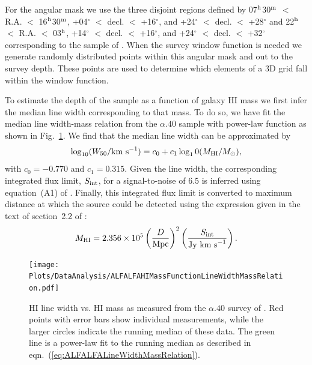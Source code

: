 For the angular mask we use the three disjoint regions defined by 07$^{\rm h}$30$^{\rm m}$ $<$ R.A. $<$ 16$^{\rm h}$30$^{\rm m}$, +04$^\circ$ $<$ decl. $<$ +16$^\circ$, and +24$^\circ$ $<$ decl. $<$ +28$^\circ$ and 22$^{\rm h}$ $<$ R.A. $<$ 03$^{\rm h}$, +14$^\circ$ $<$ decl. $<$ +16$^\circ$, and +24$^\circ$ $<$ decl. $<$ +32$^\circ$ corresponding to the sample of \cite{martin_arecibo_2010}. When the survey window function is needed we generate randomly distributed points within this angular mask and out to the survey depth. These points are used to determine which elements of a 3D grid fall within the window function.

To estimate the depth of the \cite{martin_arecibo_2010} sample as a function of galaxy HI mass we first infer the median line width corresponding to that mass. To do so, we have fit the median line width-mass relation from the $\alpha.40$ sample with power-law function as shown in Fig.~\ref{fig:ALFALFALineWidthMassRelation}. We find that the median line width can be approximated by
\begin{equation}
 \log_{10} (W_{\rm 50}/\hbox{km s}^{-1}) = c_0 + c_1 \log_10(M_{\rm HI}/M_\odot),
 \label{eq:ALFALFALineWidthMassRelation}
\end{equation}
with $c_0=-0.770$ and $c_1=0.315$. Given the line width, the corresponding integrated flux limit, $S_{\rm int}$, for a signal-to-noise of $6.5$ is inferred using equation~(A1) of \cite{haynes_arecibo_2011}. Finally, this integrated flux limit is converted to maximum distance at which the source could be detected using the expression given in the text of section~2.2 of \cite{martin_arecibo_2010}:
\begin{equation}
 M_{\rm HI} = 2.356\times10^5 \left({D\over \hbox{Mpc}}\right)^2 \left({S_{\rm int}\over\hbox{Jy km s}^{-1}}\right).
\end{equation}

\begin{figure}
 \texttt{[image: Plots/DataAnalysis/ALFALFAHIMassFunctionLineWidthMassRelation.pdf]}
 \caption{HI line width vs. HI mass as measured from the $\alpha.40$ survey of \protect\cite{martin_arecibo_2010}. Red points with error bars show individual measurements, while the larger circles indicate the running median of these data. The green line is a power-law fit to the running median as described in eqn.~(\protect\ref{eq:ALFALFALineWidthMassRelation}).}
 \label{fig:ALFALFALineWidthMassRelation}
\end{figure}
